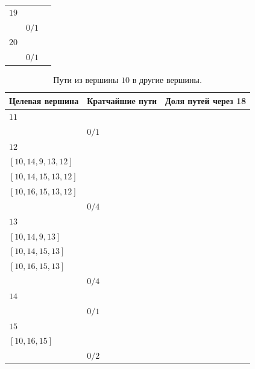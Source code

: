 \documentclass[12pt, a4paper]{extarticle}
\begin{document}
\begin{table}[h!]
\begin{tabularx}{\textwidth}{|X|X|X|}
        \hline
        $19$ & \begin{tabular}{@{}l@{}} $[9, 14, 19]$ \\ \end{tabular} & $0/1$ \\
        \hline
        $20$ & \begin{tabular}{@{}l@{}} $[9, 14, 19, 20]$ \\ \end{tabular} & $0/1$ \\
        \hline
    \end{tabularx}
\end{table}
\begin{table}[h!]
    \caption{Пути из вершины $10$ в другие вершины.}
    \label{tbl:10-10}
    \begin{tabularx}{\textwidth}{|X|X|X|}
        \hline 
        Целевая вершина & Кратчайшие пути & Доля путей через 18 \\
        \hline 
        $11$ & \begin{tabular}{@{}l@{}} $[10, 11]$ \\ \end{tabular} & $0/1$ \\
        \hline
        $12$ & \begin{tabular}{@{}l@{}} $[10, 6, 9, 13, 12]$ \\  $[10, 14, 9, 13, 12]$ \\  $[10, 14, 15, 13, 12]$ \\  $[10, 16, 15, 13, 12]$ \\ \end{tabular} & $0/4$ \\
        \hline
        $13$ & \begin{tabular}{@{}l@{}} $[10, 6, 9, 13]$ \\  $[10, 14, 9, 13]$ \\  $[10, 14, 15, 13]$ \\  $[10, 16, 15, 13]$ \\ \end{tabular} & $0/4$ \\
        \hline
        $14$ & \begin{tabular}{@{}l@{}} $[10, 14]$ \\ \end{tabular} & $0/1$ \\
        \hline
        $15$ & \begin{tabular}{@{}l@{}} $[10, 14, 15]$ \\  $[10, 16, 15]$ \\ \end{tabular} & $0/2$ \\

\end{tabularx}
\end{table}
\end{document}
